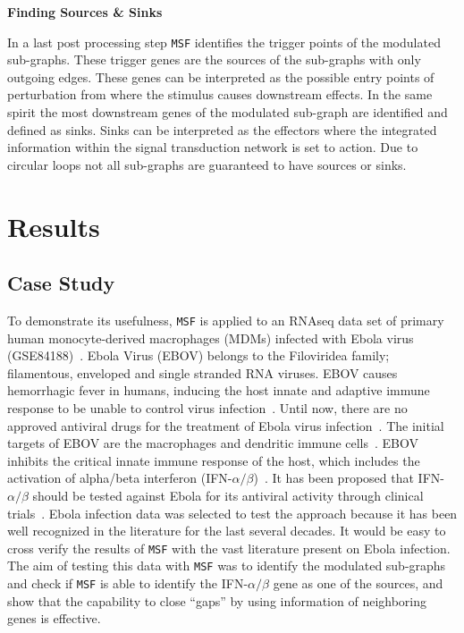 \documentclass[10pt,a4paper,twocolumn]{article}
\begin{document}
\textbf{Finding Sources \& Sinks}

In a last post processing step \texttt{MSF} identifies the trigger points
of the modulated sub-graphs. These trigger genes are the sources of the
sub-graphs with only outgoing edges. These genes can be interpreted as the
possible entry points of perturbation from where the stimulus causes
downstream effects. In the same spirit the most downstream genes of the
modulated sub-graph are identified and defined as sinks. Sinks can be
interpreted as the effectors where the integrated information within the
signal transduction network is set to action. Due to circular loops not all
sub-graphs are guaranteed to have sources or sinks.


\section*{Results}

\subsection*{Case Study}

To demonstrate its usefulness, \texttt{MSF} is applied to an RNAseq data
set of primary human monocyte-derived macrophages (MDMs) infected with
Ebola virus (GSE84188)~\cite{Olejnik}. Ebola Virus (EBOV) belongs to the
Filoviridea family; filamentous, enveloped and single stranded RNA
viruses. EBOV causes hemorrhagic fever in humans, inducing the host innate
and adaptive immune response to be unable to control virus
infection~\cite{Prins}. Until now, there are no approved antiviral drugs
for the treatment of Ebola virus infection~\cite{Konde,Rhein}.  The initial
targets of EBOV are the macrophages and dendritic immune
cells~\cite{Falasca,Rhein}. EBOV inhibits the critical innate immune
response of the host, which includes the activation of alpha/beta
interferon (IFN-$\alpha / \beta$)~\cite{Prins,Konde,Cardenas}. It has been
proposed that IFN-$\alpha / \beta$ should be tested against Ebola for its
antiviral activity through clinical trials~\cite{Konde}. Ebola infection data was selected to test the approach because it has been well recognized in the literature for the last several decades. It would be easy to cross verify the results of \texttt{MSF} with the vast literature present on Ebola infection.
The aim of testing this data with \texttt{MSF} was to identify the modulated sub-graphs and check if \texttt{MSF} is able to
identify the IFN-$\alpha / \beta$ gene as one of the sources, and show that
the capability to close ``gaps'' by using information of neighboring genes
is effective.
\end{document}
